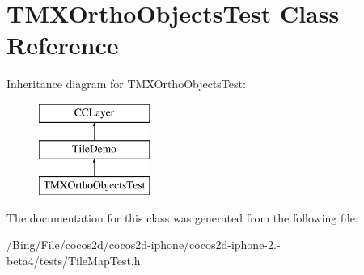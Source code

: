 \hypertarget{interface_t_m_x_ortho_objects_test}{\section{T\-M\-X\-Ortho\-Objects\-Test Class Reference}
\label{interface_t_m_x_ortho_objects_test}
}
Inheritance diagram for T\-M\-X\-Ortho\-Objects\-Test\-:\begin{figure}[H]
\begin{center}
\leavevmode
\includegraphics[height=3.000000cm]{interface_t_m_x_ortho_objects_test}
\end{center}
\end{figure}


The documentation for this class was generated from the following file\-:\begin{DoxyCompactItemize}
\item 
/\-Bing/\-File/cocos2d/cocos2d-\/iphone/cocos2d-\/iphone-\/2.-\/beta4/tests/Tile\-Map\-Test.\-h\end{DoxyCompactItemize}
